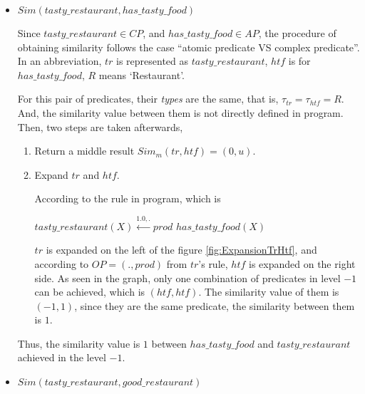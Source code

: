 \begin{itemize}
 \item $Sim(tasty\_restaurant,has\_tasty\_food)$

Since $tasty\_restaurant \in CP$, and $has\_tasty\_food \in AP$, the procedure of obtaining similarity follows the case ``atomic predicate VS complex predicate''.
In an abbreviation, $tr$ is represented as $tasty\_restaurant$, $htf$ is for $has\_tasty\_food$, $R$ means `Restaurant'.

For this pair of predicates, their \textit{types} are the same, that is, $\tau_{tr}=\tau_{htf}=R$. And, the similarity value between them is not directly defined in program. Then, two steps are taken afterwards,
\begin{enumerate}
 \item Return a middle result $Sim_{m}(tr,htf)=(0,u)$.
 \item Expand $tr$ and $htf$.     
 	 
       According to the rule in program, which is 
       \begin{center}
         $tasty\_restaurant(X) \stackrel{1.0,.}{\longleftarrow} prod$ $has\_tasty\_food(X)$
       \end{center}
       $tr$ is expanded on the left of the figure \ref{fig:ExpansionTrHtf}, and according to $OP=(.,prod)$ from $tr$'s rule, $htf$ is expanded on the right side. As seen in the graph, only one combination of predicates in level $-1$ can be achieved, which is $(htf, htf)$. The similarity value of them is $(-1,1)$, since they are the same predicate, the similarity between them is $1$.  
\end{enumerate}
Thus, the similarity value is $1$ between $has\_tasty\_food$ and $tasty\_restaurant$ achieved in the level $-1$.

 \item $Sim(tasty\_restaurant,good\_restaurant)$
 

\end{itemize}
